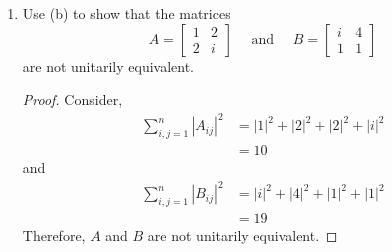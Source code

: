 \documentclass[11pt]{scrartcl}
\begin{document}
\begin{enumerate}[label=\alph*.]
{	      }
	\item{
	      Use (b) to show that the matrices
	      $$
		      A = \begin{bmatrix}
			      1 & 2 \\
			      2 & i
		      \end{bmatrix}
		      \quad \text { and } \quad
		      B = \begin{bmatrix}
			      i & 4 \\
			      1 & 1
		      \end{bmatrix}
	      $$
	      are not unitarily equivalent.
	      \begin{proof}
		      Consider,
		      \begin{align*}
			      \sum_{i, j=1}^{n}|A_{i j}|^{2} & = |1|^2 + |2|^2 + |2|^2 + |i|^2 \\
			                                     & = 10
		      \end{align*}
		      and
		      \begin{align*}
			      \sum_{i, j=1}^{n}|B_{i j}|^{2} & = |i|^2 + |4|^2 + |1|^2 + |1|^2 \\
			                                     & = 19
		      \end{align*}
		      Therefore, $A$ and $B$ are not unitarily equivalent.
	      \end{proof}
	      }
\end{enumerate}
\end{document}
